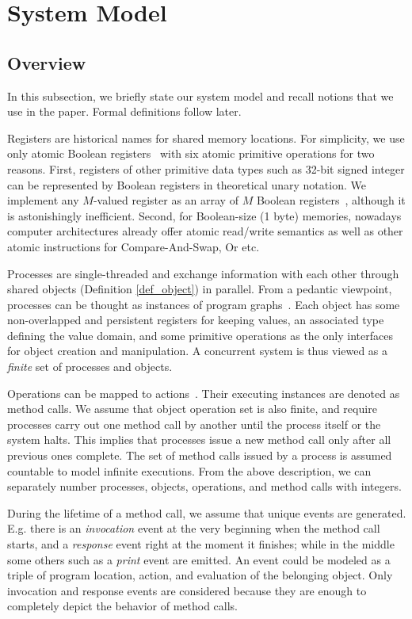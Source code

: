 \documentclass[a4paper,USenglish]{lipics-v2016}
\begin{document}
\section{System Model}\label{sec:foundation}

\subsection{Overview}\label{sec:model_overview}

In this subsection, we briefly state our system model and recall notions that we use in the paper.
Formal definitions follow later.

Registers are historical names for shared memory locations.
For simplicity, we use only atomic Boolean registers~\cite{Lamport86-1, Lamport86-2}
with six atomic primitive operations for two reasons.
First, registers of other primitive data types such as 32-bit signed integer can be represented by Boolean registers in theoretical unary notation.
We implement any $M$-valued register as an array of $M$ Boolean registers~\cite{Herlihy08},
although it is astonishingly inefficient.
Second, for Boolean-size (1 byte) memories, nowadays computer architectures already offer atomic read/write semantics as well as other atomic instructions for Compare-And-Swap, Or etc.


Processes are single-threaded and exchange information with each other through shared objects (Definition \ref{def_object}) in parallel.
From a pedantic viewpoint, processes can be thought as instances of program graphs~\cite{Pnueli92}.
Each object has some non-overlapped and persistent registers for keeping values,
an associated type defining the value domain,
and some primitive operations as the only interfaces for object creation and manipulation.
A concurrent system is thus viewed as a \textit{finite} set of processes and objects.

Operations can be mapped to actions~\cite{Kropf99}.
Their executing instances are denoted as method calls.
We assume that object operation set is also finite,
and require processes carry out one method call by another until the process itself or the system halts.
This implies that processes issue a new method call only after all previous ones complete.
The set of method calls issued by a process is assumed countable to model infinite executions.
From the above description, we can separately number processes, objects, operations, and method calls with integers.

During the lifetime of a method call, we assume that unique events are generated.
E.g. there is an \textit{invocation} event at the very beginning when the method call starts,
and a \textit{response} event right at the moment it finishes;
while in the middle some others such as a \textit{print} event are emitted.
An event could be modeled as a triple of program location, action, and evaluation of the belonging object.
Only invocation and response events are considered
because they are enough to completely depict the behavior of method calls.
\end{document}
